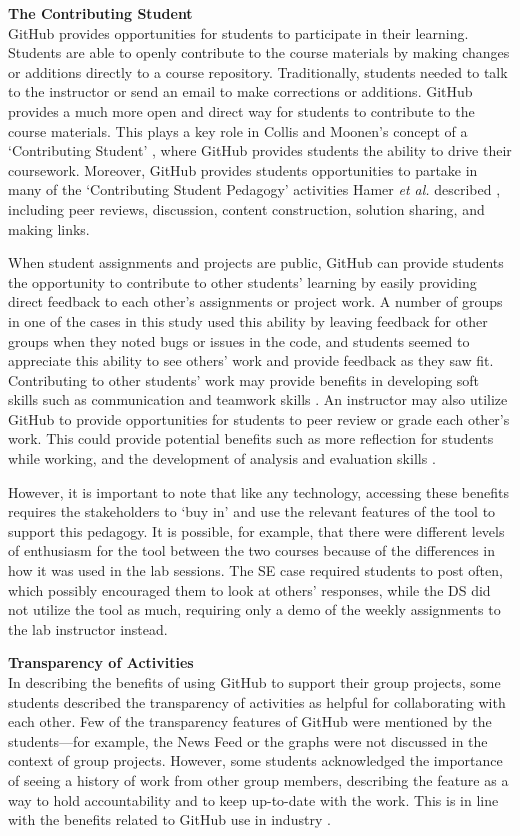 \textbf{The Contributing Student} \\
GitHub provides opportunities for students to participate in their learning. Students are able to openly contribute to the course materials by making changes or additions directly to a course repository. Traditionally, students needed to talk to the instructor or send an email to make corrections or additions. GitHub provides a much more open and direct way for students to contribute to the course materials. This plays a key role in Collis and Moonen's concept of a `Contributing Student' \cite{collis2006contributing}, where GitHub provides students the ability to drive their coursework. Moreover, GitHub provides students opportunities to partake in many of the `Contributing Student Pedagogy' activities Hamer \textit{et al.} described \cite{hamer2011tools}, including peer reviews, discussion, content construction, solution sharing, and making links.

When student assignments and projects are public, GitHub can provide students the opportunity to contribute to other students' learning by easily providing direct feedback to each other's assignments or project work. A number of groups in one of the cases in this study used this ability by leaving feedback for other groups when they noted bugs or issues in the code, and students seemed to appreciate this ability to see others' work and provide feedback as they saw fit. Contributing to other students' work may provide benefits in developing soft skills such as communication and teamwork skills \cite{hamer2006some}. An instructor may also utilize GitHub to provide opportunities for students to peer review or grade each other's work. This could provide potential benefits such as more reflection for students while working, and the development of analysis and evaluation skills \cite{sondergaard2012collaborative}.

However, it is important to note that like any technology, accessing these benefits requires the stakeholders to `buy in' and use the relevant features of the tool to support this pedagogy. It is possible, for example, that there were different levels of enthusiasm for the tool between the two courses because of the differences in how it was used in the lab sessions. The SE case required students to post often, which possibly encouraged them to look at others' responses, while the DS did not utilize the tool as much, requiring only a demo of the weekly assignments to the lab instructor instead.

\textbf{Transparency of Activities} \\
In describing the benefits of using GitHub to support their group projects, some students described the transparency of activities as helpful for collaborating with each other. Few of the transparency features of GitHub were mentioned by the students---for example, the News Feed or the graphs were not discussed in the context of group projects. However, some students acknowledged the importance of seeing a history of work from other group members, describing the feature as a way to hold accountability and to keep up-to-date with the work. This is in line with the benefits related to GitHub use in industry \cite{dabbish2012social}.

